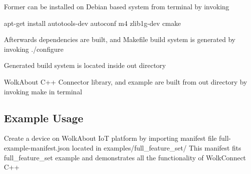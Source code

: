 Former can be installed on Debian based system from terminal by invoking

{\ttfamily apt-\/get install autotools-\/dev autoconf m4 zlib1g-\/dev cmake}

Afterwards dependencies are built, and Makefile build system is generated by invoking {\ttfamily ./configure}

Generated build system is located inside \textquotesingle{}out\textquotesingle{} directory

Wolk\+About C++ Connector library, and example are built from \textquotesingle{}out\textquotesingle{} directory by invoking {\ttfamily make} in terminal

\subsection*{Example Usage }

Create a device on Wolk\+About IoT platform by importing manifest file {\ttfamily full-\/example-\/manifest.\+json} located in {\ttfamily examples/full\+\_\+feature\+\_\+set/} This manifest fits {\ttfamily full\+\_\+feature\+\_\+set} example and demonstrates all the functionality of Wolk\+Connect C++

